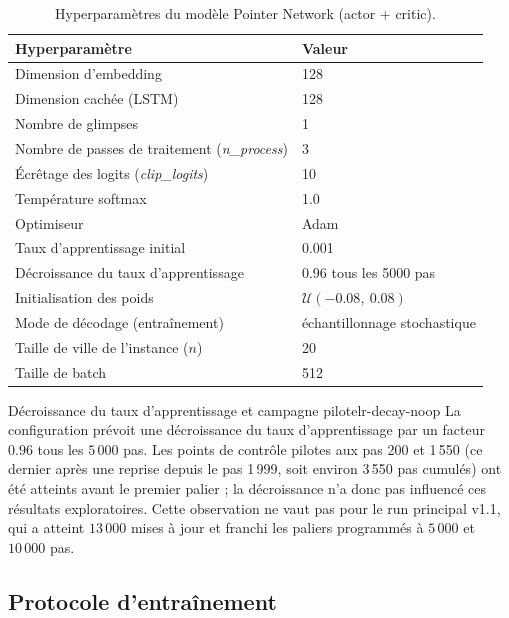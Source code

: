 \documentclass[12pt, a4paper, twoside, openright]{book}
\begin{document}
\begin{table}[H]
	\centering
	\begin{tabular}{ll}
		\toprule
		Hyperparamètre & Valeur \\
		\midrule
		Dimension d'embedding & 128 \\
		Dimension cachée (LSTM) & 128 \\
		Nombre de glimpses & 1 \\
		Nombre de passes de traitement (\textit{n\_process}) & 3 \\
		Écrêtage des logits (\textit{clip\_logits}) & 10 \\
		Température softmax & 1.0 \\
		Optimiseur & Adam \\
		Taux d'apprentissage initial & 0.001 \\
		Décroissance du taux d'apprentissage & 0.96 tous les 5000 pas \\
		Initialisation des poids & $\mathcal{U}(-0.08,\ 0.08)$ \\
		Mode de décodage (entraînement) & échantillonnage stochastique \\
		Taille de ville de l'instance ($n$) & 20 \\
		Taille de batch & 512 \\
		\bottomrule
	\end{tabular}
	\caption{Hyperparamètres du modèle Pointer Network (actor + critic).}
	\label{tab:hyperparams}
\end{table}

\begin{remark}{Décroissance du taux d'apprentissage et campagne pilote}{lr-decay-noop}
La configuration prévoit une décroissance du taux d'apprentissage par un
facteur $0.96$ tous les $5\,000$ pas. Les points de contrôle pilotes aux pas
200 et 1\,550 (ce dernier après une reprise depuis le pas 1\,999, soit environ
3\,550 pas cumulés) ont été atteints avant le premier palier ; la décroissance
n'a donc pas influencé ces résultats exploratoires. Cette observation ne vaut
pas pour le run principal v1.1, qui a atteint $13\,000$ mises à jour et franchi
les paliers programmés à $5\,000$ et $10\,000$ pas.
\end{remark}

\subsection{Protocole d'entraînement}
\label{sec:ch4-protocole}
\end{document}
